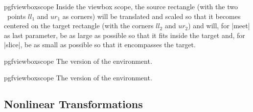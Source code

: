 \begin{environment}{{pgfviewboxscope}}
    Inside the viewbox scope, the source rectangle (with the two \pgfname\
    points $ll_1$ and $ur_1$ as corners) will be translated and scaled so that
    it becomes centered on the target rectangle (with the corners $ll_2$ and
    $ur_2$) and will, for |meet| as last parameter, be as large as possible so
    that it fits inside the target and, for |slice|, be as small as possible so
    that it encompasses the target.
\begin{codeexample}[]
\end{codeexample}
\begin{codeexample}[]
\end{codeexample}
\end{environment}

\begin{plainenvironment}{{pgfviewboxscope}}
    The \hologo{plainTeX} version of the environment.
\end{plainenvironment}

\begin{contextenvironment}{{pgfviewboxscope}}
    The \hologo{ConTeXt} version of the environment.
\end{contextenvironment}


\subsection{Nonlinear Transformations}
\label{section-nonlinear-transformations}

